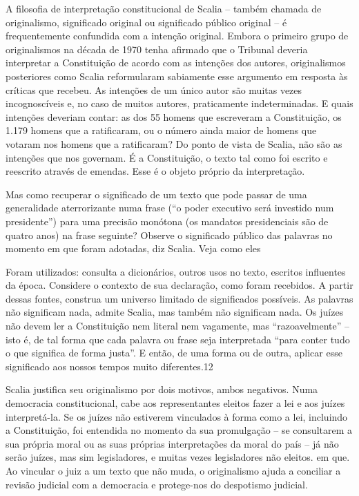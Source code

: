  \par 
A filosofia de interpretação constitucional de Scalia – também chamada de originalismo, significado original ou significado público original – é frequentemente confundida com a intenção original. Embora o primeiro grupo de originalismos na década de 1970 tenha afirmado que o Tribunal deveria interpretar a Constituição de acordo com as intenções dos autores, originalismos posteriores como Scalia reformularam sabiamente esse argumento em resposta às críticas que recebeu. As intenções de um único autor são muitas vezes incognoscíveis e, no caso de muitos autores, praticamente indeterminadas. E quais intenções deveriam contar: as dos {\color{blue}55} homens que escreveram a Constituição, os {\color{blue}1}.{\color{blue}179} homens que a ratificaram, ou o número ainda maior de homens que votaram nos homens que a ratificaram? Do ponto de vista de Scalia, não são as intenções que nos governam. É a Constituição, o texto tal como foi escrito e reescrito através de emendas. Esse é o objeto próprio da interpretação.
 \par 
Mas como recuperar o significado de um texto que pode passar de uma generalidade aterrorizante numa frase (“o poder executivo será investido num presidente”) para uma precisão monótona (os mandatos presidenciais são de quatro anos) na frase seguinte? Observe o significado público das palavras no momento em que foram adotadas, diz Scalia. Veja como eles
 \par 
Foram utilizados: consulta a dicionários, outros usos no texto, escritos influentes da época. Considere o contexto de sua declaração, como foram recebidos. A partir dessas fontes, construa um universo limitado de significados possíveis. As palavras não significam nada, admite Scalia, mas também não significam nada. Os juízes não devem ler a Constituição nem literal nem vagamente, mas “razoavelmente” – isto é, de tal forma que cada palavra ou frase seja interpretada “para conter tudo o que significa de forma justa”. E então, de uma forma ou de outra, aplicar esse significado aos nossos tempos muito diferentes.{\color{blue}12}
 \par 
Scalia justifica seu originalismo por dois motivos, ambos negativos. Numa democracia constitucional, cabe aos representantes eleitos fazer a lei e aos juízes interpretá-la. Se os juízes não estiverem vinculados à forma como a lei, incluindo a Constituição, foi entendida no momento da sua promulgação – se consultarem a sua própria moral ou as suas próprias interpretações da moral do país – já não serão juízes, mas sim legisladores, e muitas vezes legisladores não eleitos. em que. Ao vincular o juiz a um texto que não muda, o originalismo ajuda a conciliar a revisão judicial com a democracia e protege-nos do despotismo judicial.

